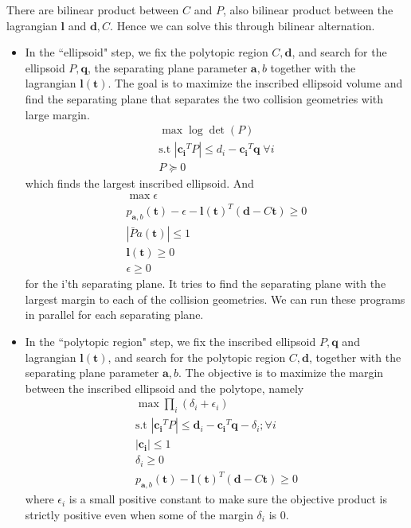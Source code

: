 \documentclass{article}
\renewcommand{\vec}[1]{\mathbf{#1}}
\begin{document}
There are bilinear product between $C$ and $P$, also bilinear product between the lagrangian $\vec{l}$ and $\vec{d}, C$. Hence we can solve this through bilinear alternation.
\begin{itemize}
	\item In the ``ellipsoid" step, we fix the polytopic region $C, \vec{d}$, and search for the ellipsoid $P, \vec{q}$, the separating plane parameter $\vec{a}, b$ together with the lagrangian $\vec{l}(\vec{t})$. The goal is to maximize the inscribed ellipsoid volume and find the separating plane that separates the two collision geometries with large margin.
\begin{align}
	\max\log\det(P)\\
	\text{s.t } |\vec{c_i}^TP|\le d_i - \vec{c_i}^T\vec{q}\;\forall i\\
	P\succeq 0
\end{align}
which finds the largest inscribed ellipsoid. And
\begin{align}
	\max{\epsilon}\\
	p_{\vec{a}, b}(\vec{t}) - \epsilon - \vec{l}(\vec{t})^T(\vec{d} - C\vec{t})\ge 0\\
	|\bar{P}a(\vec{t})|\le 1\\
	\vec{l}(\vec{t}) \ge 0\\
	\epsilon \ge 0
\end{align}
for the i'th separating plane. It tries to find the separating plane with the largest margin to each of the collision geometries. We can run these programs in parallel for each separating plane.

	\item In the ``polytopic region" step, we fix the inscribed ellipsoid $P, \vec{q}$ and lagrangian $\vec{l}(\vec{t})$, and search for the polytopic region $C, \vec{d}$, together with the separating plane parameter $\vec{a}, b$. The objective is to maximize the margin between the inscribed ellipsoid and the polytope, namely
		\begin{subequations}
		\begin{align}
			\max \prod_i(\delta_i+\epsilon_i)\\
			\text{s.t } |\vec{c_i}^TP|\le \vec{d}_i - \vec{c_i}^T\vec{q}-\delta_i;\forall i\\
			|\vec{c_i}|\le 1\\
			\delta_i\ge 0\\
			p_{\vec{a}, b}(\vec{t}) - \vec{l}(\vec{t})^T(\vec{d} - C\vec{t})\ge 0
		\end{align}
		\end{subequations}
		where $\epsilon_i$ is a small positive constant to make sure the objective product is strictly positive even when some of the margin $\delta_i$ is 0.
\end{itemize}
\end{document}
